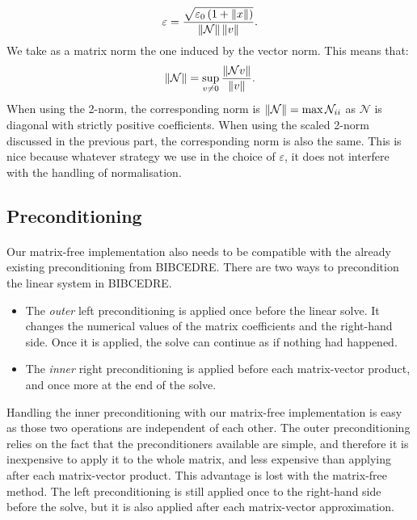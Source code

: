       \begin{equation}
        \varepsilon = \frac{\sqrt{\varepsilon_0 \left(1 + \norm{x}\right) }}{\norm{\mathcal{N}} \norm{v}} .
      \end{equation}
      We take as a matrix norm the one induced by the vector norm.
      This means that:
      \begin{equation}
        \norm{\mathcal{N}} = \sup_{v \ne 0} \frac{\norm{\mathcal{N}v}}{\norm{v}} .
      \end{equation}
      When using the 2-norm, the corresponding norm is $\norm{\mathcal{N}} = \max{\mathcal{N}_{ii}}$ as $\mathcal{N}$ is diagonal with strictly positive coefficients.
      When using the scaled 2-norm discussed in the previous part, the corresponding norm is also the same.
      This is nice because whatever strategy we use in the choice of $\varepsilon$, it does not interfere with the handling of normalisation.


    \subsection{Preconditioning}

      \paragraph{}
      Our matrix-free implementation also needs to be compatible with the already existing preconditioning from BIBCEDRE.
      There are two ways to precondition the linear system in BIBCEDRE.
      \begin{itemize}
        \item The \emph{outer} left preconditioning is applied once before the linear solve.
          It changes the numerical values of the matrix coefficients and the right-hand side.
          Once it is applied, the solve can continue as if nothing had happened.
        \item The \emph{inner} right preconditioning is applied before each matrix-vector product, and once more at the end of the solve.
      \end{itemize}
      Handling the inner preconditioning with our matrix-free implementation is easy as those two operations are independent of each other.
      The outer preconditioning relies on the fact that the preconditioners available are simple, and therefore it is inexpensive to apply it to the whole matrix, and less expensive than applying after each matrix-vector product.
      This advantage is lost with the matrix-free method.
      The left preconditioning is still applied once to the right-hand side before the solve, but it is also applied after each matrix-vector approximation.



